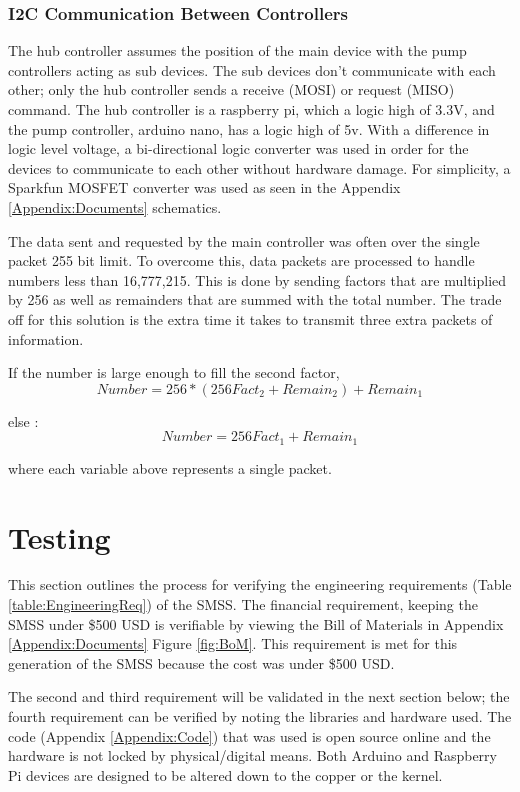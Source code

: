 \documentclass[journal]{IEEEtran}
\begin{document}
            \subsubsection{I2C Communication Between Controllers}
                The hub controller assumes the position of the main device with the pump controllers acting as sub devices. The sub devices don't communicate with each other; only the hub controller sends a receive (MOSI) or request (MISO) command. The hub controller is a raspberry pi,  which a logic high of 3.3V, and the pump controller, arduino nano, has a logic high of 5v. With a difference in logic level voltage, a bi-directional logic converter was used in order for the devices to communicate to each other without hardware damage. For simplicity, a Sparkfun MOSFET converter was used as seen in the Appendix \ref{Appendix:Documents} schematics. 
                
                The data sent and requested by the main controller was often over the single packet 255 bit limit. To overcome this, data packets are processed to handle numbers less than 16,777,215. This is done by sending factors that are multiplied by 256 as well as remainders that are summed with the total number. The trade off for this solution is the extra time it takes to transmit three extra packets of information.  
                
                
                If the number is large enough to fill the second factor,
                \[ Number = 256 * (256 Fact_2 + Remain_2) + Remain_1\]
                
                else :
                \[ Number = 256 Fact_1 + Remain_1\]
                
                where each variable above represents a single packet.
                

\section{Testing}
        This section outlines the process for verifying the engineering requirements (Table \ref{table:EngineeringReq}) of the SMSS. The financial requirement, keeping the SMSS under \$500 USD is verifiable by viewing the Bill of Materials in Appendix \ref{Appendix:Documents} Figure \ref{fig:BoM}. This requirement is met for this generation of the SMSS because the cost was under \$500 USD. 
        
        The second and third requirement will be validated in the next section below; the fourth requirement can be verified by noting the libraries and hardware used. The code (Appendix \ref{Appendix:Code}) that was used is open source online and the hardware is not locked by physical/digital means. Both Arduino and Raspberry Pi devices are designed to be altered down to the copper or the kernel. 
        
\end{document}
